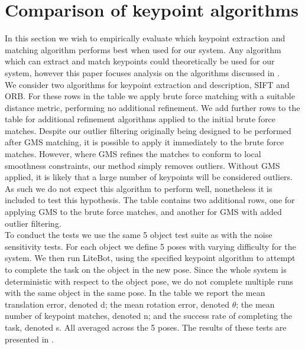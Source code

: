 \section{Comparison of keypoint algorithms}
\label{sec:algos-test}
In this section we wish to empirically evaluate which keypoint extraction and matching algorithm performs best when used for our system. Any algorithm which can extract and match keypoints could theoretically be used for our system, however this paper focuses analysis on the algorithms discussed in .\\

We consider two algorithms for keypoint extraction and description, SIFT and ORB. For these rows in the table we apply brute force matching with a suitable distance metric, performing no additional refinement. We add further rows to the table for additional refinement algorithms applied to the initial brute force matches. Despite our outlier filtering originally being designed to be performed after GMS matching, it is possible to apply it immediately to the brute force matches. However, where GMS refines the matches to conform to local smoothness constraints, our method simply removes outliers. Without GMS applied, it is likely that a large number of keypoints will be considered outliers. As such we do not expect this algorithm to perform well, nonetheless it is included to test this hypothesis. The table contains two additional rows, one for applying GMS to the brute force matches, and another for GMS with added outlier filtering.\\

To conduct the tests we use the same 5 object test suite as with the noise sensitivity tests. For each object we define 5 poses with varying difficulty for the system. We then run LiteBot, using the specified keypoint algorithm to attempt to complete the task on the object in the new pose. Since the whole system is deterministic with respect to the object pose, we do not complete multiple runs with the same object in the same pose. In the table we report the mean translation error, denoted d; the mean rotation error, denoted $\theta$; the mean number of keypoint matches, denoted n; and the success rate of completing the task, denoted s. All averaged across the 5 poses. The results of these tests are presented in .\\

